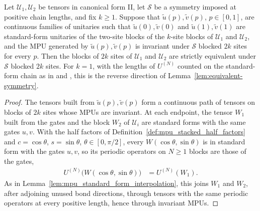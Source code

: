 \begin{lemma}
    \label{lem:mpu_symmetry_path_criterion_reverse}
    \leanok
    Let $\mathcal U_1,\mathcal U_2$ be tensors in canonical form II, let
    $\mathcal S$ be a symmetry imposed at positive chain lengths, and fix
    $k\geq1$. Suppose that $\widetilde u(p),\widetilde v(p)$, $p\in[0,1]$, are
    continuous families of unitaries such that $\widetilde u(0),\widetilde v(0)$
    and $\widetilde u(1),\widetilde v(1)$ are standard-form unitaries of the
    two-site blocks of the $k$-site blocks of $\mathcal U_1$ and $\mathcal U_2$,
    and the MPU generated by $\widetilde u(p),\widetilde v(p)$ is invariant
    under $\mathcal S$ blocked $2k$ sites for every $p$. Then the blocks of
    $2k$ sites of $\mathcal U_1$ and $\mathcal U_2$ are strictly equivalent
    under $\mathcal S$ blocked $2k$ sites. For $k=1$, with the lengths of $U^{(N)}$ counted on the
    standard-form chain as in \cite{gap:mpu_standard_form_canonical_convention}
    and \cite{gap:mpu_standard_form_parity_gap}, this is the reverse direction
    of Lemma~\ref{lem:equivalent-symmetry}.
\end{lemma}

\begin{proof}
    \leanok
    The tensors built from $\widetilde u(p),\widetilde v(p)$ form a continuous
    path of tensors on blocks of $2k$ sites whose MPUs are invariant. At each
    endpoint, the tensor $W_1$ built from the gates and the block $W_2$ of
    $\mathcal U_i$ are standard forms with the same gates $u,v$. With the half
    factors of Definition~\ref{def:mpu_stacked_half_factors} and
    $c=\cos\theta$, $s=\sin\theta$, $\theta\in[0,\pi/2]$, every
    $W(\cos\theta,\sin\theta)$ is in standard form with the gates $u,v$, so
    its periodic operators on $N\geq1$ blocks are those of the gates,
    \begin{align}
        U^{(N)}\bigl(W(\cos\theta,\sin\theta)\bigr) & =U^{(N)}(W_1).
    \end{align}
    As in Lemma~\ref{lem:mpu_standard_form_interpolation}, this joins $W_1$
    and $W_2$, after adjoining unused bond directions, through tensors with
    the same periodic operators at every positive length, hence through
    invariant MPUs.
\end{proof}

